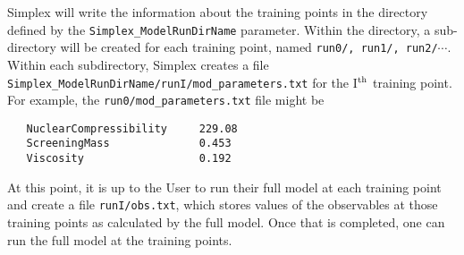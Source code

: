 \documentclass[main.tex]{subfiles}
\begin{document}
Simplex will write the information about the training points in the directory defined by the {\tt Simplex\_ModelRunDirName} parameter. Within the directory, a sub-directory will be created for each training point, named {\tt run0/, run1/, run2/}$\cdots$. Within each subdirectory, Simplex creates a file {\tt Simplex\_ModelRunDirName/runI/mod\_parameters.txt} for the I$^{\rm th}$ training point. For example, the {\tt run0/mod\_parameters.txt} file might be
{\tt\begin{verbatim}
   NuclearCompressibility     229.08
   ScreeningMass              0.453
   Viscosity                  0.192
\end{verbatim}
}
At this point, it is up to the User to run their full model at each training point and create a file {\tt runI/obs.txt}, which stores values of the observables at those training points as calculated by the full model. Once that is completed, one can run the full model at the training points. 
\end{document}
